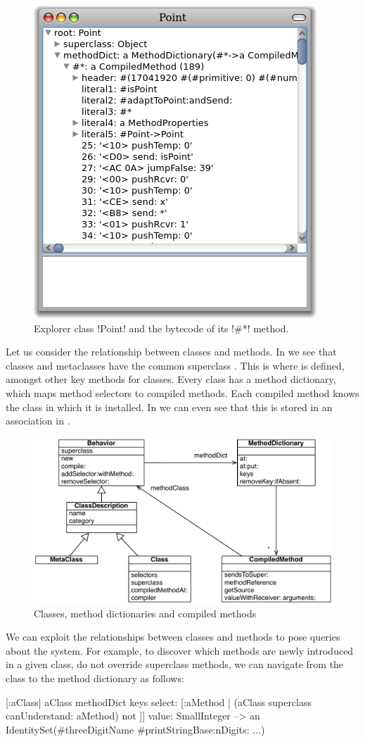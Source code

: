 \documentclass[a4paper,10pt,twoside]{book}
\begin{document}
\begin{figure}[ht]\centering
	\includegraphics[width=.5\linewidth]{CompiledMethod}
	\caption{Explorer class \ct!Point! and the bytecode of its \ct!\#*! method.\label{fig:CompiledMethod}}
\end{figure}

Let us consider the relationship between classes and methods.
In  we see that classes and metaclasses have the common superclass . This is where  is defined, amongst other key methods for classes.
Every class has a method dictionary, which maps method selectors to compiled methods.
Each compiled method knows the class in which it is installed.
In  we can even see that this is stored in an association in .

\begin{figure}[ht]\centering
	\includegraphics[width=0.8\linewidth]{MethodsAsObjects}
	\caption{Classes, method dictionaries and compiled methods\label{fig:MethodsAsObjects}}
\end{figure}

We can exploit the relationships between classes and methods to pose queries about the system.
For example, to discover which methods are newly introduced in a given class, \ie do not override superclass methods, we can navigate from the class to the method dictionary as follows:
\begin{code}{}
[:aClass| aClass methodDict keys select: [:aMethod |
  (aClass superclass canUnderstand: aMethod) not ]] value: SmallInteger
  --> an IdentitySet(#threeDigitName #printStringBase:nDigits: ...)
\end{code}
\end{document}
